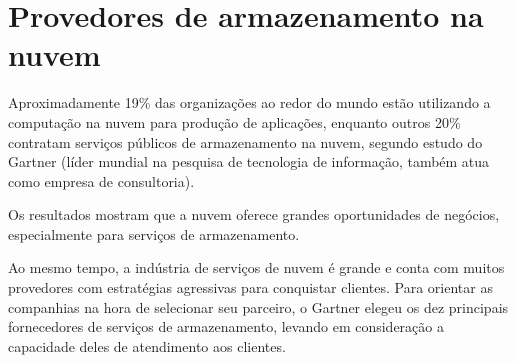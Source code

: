 \section{Provedores de armazenamento na nuvem}

Aproximadamente 19\% das organizações ao redor do mundo estão utilizando a
computação na nuvem para produção de aplicações, enquanto outros 20\% contratam
serviços públicos de armazenamento na nuvem, segundo estudo do Gartner (líder
mundial na pesquisa de tecnologia de informação, também atua como empresa de
consultoria).

Os resultados mostram que a nuvem oferece grandes oportunidades de negócios,
especialmente para serviços de armazenamento. 

Ao mesmo tempo, a indústria de serviços de nuvem é grande e conta com muitos
provedores com estratégias agressivas para conquistar clientes. Para orientar as
companhias na hora de selecionar seu parceiro, o Gartner elegeu os dez principais
fornecedores de serviços de armazenamento, levando em consideração a capacidade
deles de atendimento aos clientes.
